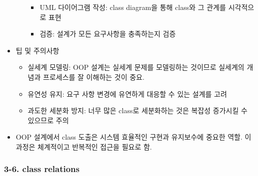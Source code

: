\begin{itemize}
\begin{enumerate}
    \begin{itemize}
    \tightlist
    \item
      UML 다이어그램 작성: class diagram을 통해 class와 그 관계를
      시각적으로 표현
    \item
      검증: 설계가 모든 요구사항을 충족하는지 검증
    \end{itemize}
  \end{enumerate}
\item
  팁 및 주의사항

  \begin{itemize}
  \tightlist
  \item
    실세계 모델링: OOP 설계는 실세계 문제를 모델링하는 것이므로 실세계의
    개념과 프로세스를 잘 이해하는 것이 중요.
  \item
    유연성 유지: 요구 사항 변경에 유연하게 대응할 수 있는 설계를 고려
  \item
    과도한 세분화 방지: 너무 많은 class로 세분화하는 것은 복잡성
    증가시킬 수 있으므로 주의
  \end{itemize}
\item
  OOP 설계에서 class 도출은 시스템 효율적인 구현과 유지보수에 중요한
  역할. 이 과정은 체계적이고 반복적인 접근을 필요로 함.
\end{itemize}

\hypertarget{class-relations}{%
\subsubsection{3-6. class relations}\label{class-relations}}

